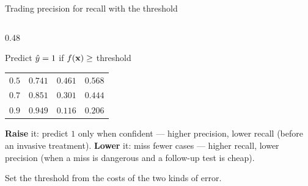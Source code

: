 \documentclass[aspectratio=169,10pt]{beamer}
\begin{document}
\begin{frame}{Trading precision for recall with the threshold}
\begin{columns}[T,onlytextwidth]
\begin{column}{0.48\textwidth}
\begin{block}{Predict $\hat{y}=1$ if $f(\mathbf{x})\ge$ threshold}
\begin{tabular}{@{}cccc@{}}
          $0.5$ & $0.741$ & $0.461$ & $0.568$\\
          $0.7$ & $0.851$ & $0.301$ & $0.444$\\
          $0.9$ & $0.949$ & $0.116$ & $0.206$\\
          \bottomrule
        \end{tabular}
      \end{block}
      \textbf{Raise} it: predict $1$ only when confident --- higher precision, lower recall
      (before an invasive treatment). \textbf{Lower} it: miss fewer cases --- higher recall,
      lower precision (when a miss is dangerous and a follow-up test is cheap).
      \begin{pitfall}
        \footnotesize Set the threshold from the costs of the two kinds of error.
      \end{pitfall}
    \end{column}
  \end{columns}
\end{frame}
\end{document}

